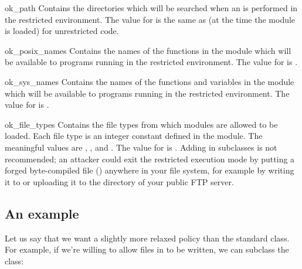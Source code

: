 \begin{memberdesc}{ok_path}
Contains the directories which will be searched when an 
is performed in the restricted environment.  
The value for  is the same as  (at the time
the module is loaded) for unrestricted code.
\end{memberdesc}

\begin{memberdesc}{ok_posix_names}
Contains the names of the functions in the  module which will be
available to programs running in the restricted environment.  The
value for  is .
\end{memberdesc}

\begin{memberdesc}{ok_sys_names}
Contains the names of the functions and variables in the 
module which will be available to programs running in the restricted
environment.  The value for  is .
\end{memberdesc}

\begin{memberdesc}{ok_file_types}
Contains the file types from which modules are allowed to be loaded.
Each file type is an integer constant defined in the  module.
The meaningful values are , , and
.  The value for  is .  Adding  in subclasses is not recommended;
an attacker could exit the restricted execution mode by putting a forged
byte-compiled file () anywhere in your file system, for example
by writing it to  or uploading it to the 
directory of your public FTP server.
\end{memberdesc}


\subsection{An example}

Let us say that we want a slightly more relaxed policy than the
standard  class.  For example, if we're willing to allow
files in  to be written, we can subclass the 
class:

